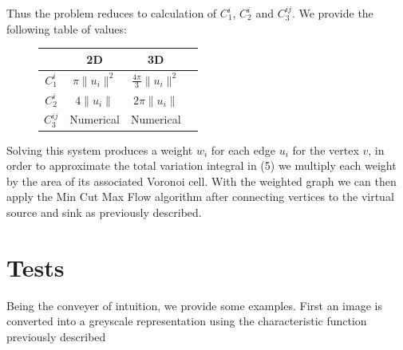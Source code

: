 \documentclass[12pt]{article}
\begin{document}
Thus the problem reduces to calculation of $C_1^i$, $C_2^i$ and $C_3^{ij}$. We provide the following table of values:

\begin{figure}[H]
\centering
\begin{tabular}{|c|c|c|c|}
\hline
 &  2D  & 3D  \\
\hline
 $C_1^i$ & $\pi \| u_i \|^2$  & $\frac{4\pi}{3}\|u_i\|^2$   \\
\hline
 $C_2^i$ & $4\| u_i \|$  & $2\pi \|u_i\|$    \\
\hline
 $C_3^{ij}$ & Numerical  & Numerical    \\
\hline
\end{tabular}
\end{figure}

Solving this system produces a weight $w_i$ for each edge $u_i$ for the vertex $v$, in order to approximate the total variation integral in (5) we multiply each weight by the area of its associated Voronoi cell. With the weighted graph we can then apply the Min Cut Max Flow algorithm after connecting vertices to the virtual source and sink as previously described. 


\section{Tests}

Being the conveyer of intuition, we provide some examples. First an image is converted into a greyscale representation using the characteristic function previously described 
\end{document}
